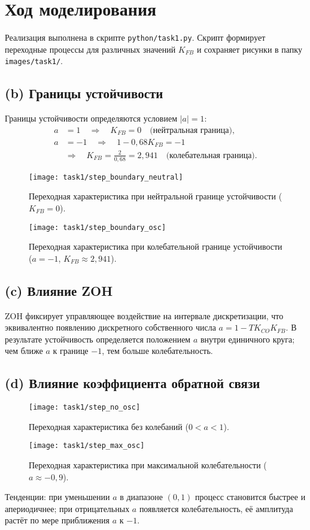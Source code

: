 \section{Ход моделирования}
Реализация выполнена в скрипте \texttt{python/task1.py}. Скрипт формирует переходные процессы для различных значений \(K_{FB}\) и сохраняет рисунки в папку \texttt{images/task1/}.

\subsection*{(b) Границы устойчивости}
Границы устойчивости определяются условием \(|a| = 1\):
\begin{align}
  a &= 1 \quad \Rightarrow \quad K_{FB} = 0 \quad \text{(нейтральная граница)}, \\
  a &= -1 \quad \Rightarrow \quad 1 - 0{,}68 K_{FB} = -1 \\
  &\Rightarrow \quad K_{FB} = \frac{2}{0{,}68} = 2{,}941 \quad \text{(колебательная граница)}.
\end{align}
\begin{figure}[H]
  \centering
  \texttt{[image: task1/step\_boundary\_neutral]}
  \caption{Переходная характеристика при нейтральной границе устойчивости (\(K_{FB}=0\)).}
  \label{fig:task1_neutral}
\end{figure}
\begin{figure}[H]
  \centering
  \texttt{[image: task1/step\_boundary\_osc]}
  \caption{Переходная характеристика при колебательной границе устойчивости (\(a=-1\), \(K_{FB}\approx2{,}941\)).}
  \label{fig:task1_osc}
\end{figure}

\subsection*{(c) Влияние ZOH}
ZOH фиксирует управляющее воздействие на интервале дискретизации, что эквивалентно появлению дискретного собственного числа \(a=1-TK_{CO}K_{FB}\). В результате устойчивость определяется положением \(a\) внутри единичного круга; чем ближе \(a\) к границе \(-1\), тем больше колебательность.

\subsection*{(d) Влияние коэффициента обратной связи}
\begin{figure}[H]
  \centering
  \texttt{[image: task1/step\_no\_osc]}
  \caption{Переходная характеристика без колебаний (\(0<a<1\)).}
  \label{fig:task1_no_osc}
\end{figure}
\begin{figure}[H]
  \centering
  \texttt{[image: task1/step\_max\_osc]}
  \caption{Переходная характеристика при максимальной колебательности (\(a\approx-0{,}9\)).}
  \label{fig:task1_max_osc}
\end{figure}
Тенденции: при уменьшении \(a\) в диапазоне \((0,1)\) процесс становится быстрее и апериодичнее; при отрицательных \(a\) появляется колебательность, её амплитуда растёт по мере приближения \(a\) к \(-1\).

